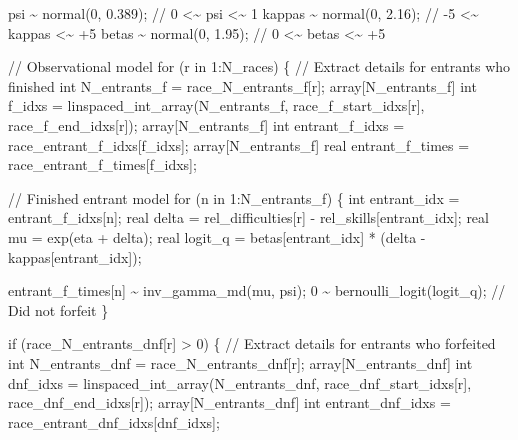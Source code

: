 \documentclass[
  letterpaper,
  DIV=11,
  numbers=noendperiod]{scrartcl}
\newenvironment{Shaded}{\begin{snugshade}}{\end{snugshade}}
\newcommand{\CommentTok}[1]{\textcolor[rgb]{0.37,0.37,0.37}{#1}}
\newcommand{\ControlFlowTok}[1]{\textcolor[rgb]{0.00,0.23,0.31}{#1}}
\newcommand{\DataTypeTok}[1]{\textcolor[rgb]{0.68,0.00,0.00}{#1}}
\newcommand{\DecValTok}[1]{\textcolor[rgb]{0.68,0.00,0.00}{#1}}
\newcommand{\FloatTok}[1]{\textcolor[rgb]{0.68,0.00,0.00}{#1}}
\newcommand{\NormalTok}[1]{\textcolor[rgb]{0.00,0.23,0.31}{#1}}
\begin{document}
\begin{codelisting}
\begin{Shaded}
\begin{Highlighting}[]
\NormalTok{  psi \textasciitilde{} normal(}\DecValTok{0}\NormalTok{, }\FloatTok{0.389}\NormalTok{);   }\CommentTok{//  0 \textless{}\textasciitilde{} psi    \textless{}\textasciitilde{} 1}
\NormalTok{  kappas \textasciitilde{} normal(}\DecValTok{0}\NormalTok{, }\FloatTok{2.16}\NormalTok{); }\CommentTok{// {-}5 \textless{}\textasciitilde{} kappas \textless{}\textasciitilde{} +5}
\NormalTok{  betas \textasciitilde{} normal(}\DecValTok{0}\NormalTok{, }\FloatTok{1.95}\NormalTok{);  }\CommentTok{//  0 \textless{}\textasciitilde{} betas  \textless{}\textasciitilde{} +5}

  \CommentTok{// Observational model}
  \ControlFlowTok{for}\NormalTok{ (r }\ControlFlowTok{in} \DecValTok{1}\NormalTok{:N\_races) \{}
    \CommentTok{// Extract details for entrants who finished}
    \DataTypeTok{int}\NormalTok{ N\_entrants\_f = race\_N\_entrants\_f[r];}
    \DataTypeTok{array}\NormalTok{[N\_entrants\_f] }\DataTypeTok{int}\NormalTok{ f\_idxs}
\NormalTok{      = linspaced\_int\_array(N\_entrants\_f,}
\NormalTok{                            race\_f\_start\_idxs[r],}
\NormalTok{                            race\_f\_end\_idxs[r]);}
    \DataTypeTok{array}\NormalTok{[N\_entrants\_f] }\DataTypeTok{int}\NormalTok{ entrant\_f\_idxs}
\NormalTok{      = race\_entrant\_f\_idxs[f\_idxs];}
    \DataTypeTok{array}\NormalTok{[N\_entrants\_f] }\DataTypeTok{real}\NormalTok{ entrant\_f\_times}
\NormalTok{      = race\_entrant\_f\_times[f\_idxs];}

    \CommentTok{// Finished entrant model}
    \ControlFlowTok{for}\NormalTok{ (n }\ControlFlowTok{in} \DecValTok{1}\NormalTok{:N\_entrants\_f) \{}
      \DataTypeTok{int}\NormalTok{ entrant\_idx = entrant\_f\_idxs[n];}
      \DataTypeTok{real}\NormalTok{ delta = rel\_difficulties[r] {-} rel\_skills[entrant\_idx];}
      \DataTypeTok{real}\NormalTok{ mu = exp(eta + delta);}
      \DataTypeTok{real}\NormalTok{ logit\_q = betas[entrant\_idx] * (delta {-} kappas[entrant\_idx]);}

\NormalTok{      entrant\_f\_times[n] \textasciitilde{} inv\_gamma\_md(mu, psi);}
      \DecValTok{0}\NormalTok{ \textasciitilde{} bernoulli\_logit(logit\_q); }\CommentTok{// Did not forfeit}
\NormalTok{    \}}

    \ControlFlowTok{if}\NormalTok{ (race\_N\_entrants\_dnf[r] \textgreater{} }\DecValTok{0}\NormalTok{) \{}
      \CommentTok{// Extract details for entrants who forfeited}
      \DataTypeTok{int}\NormalTok{ N\_entrants\_dnf = race\_N\_entrants\_dnf[r];}
      \DataTypeTok{array}\NormalTok{[N\_entrants\_dnf]}
        \DataTypeTok{int}\NormalTok{ dnf\_idxs = linspaced\_int\_array(N\_entrants\_dnf,}
\NormalTok{                                           race\_dnf\_start\_idxs[r],}
\NormalTok{                                           race\_dnf\_end\_idxs[r]);}
      \DataTypeTok{array}\NormalTok{[N\_entrants\_dnf]}
        \DataTypeTok{int}\NormalTok{ entrant\_dnf\_idxs = race\_entrant\_dnf\_idxs[dnf\_idxs];}


\end{Highlighting}
\end{Shaded}
\end{codelisting}
\end{document}
